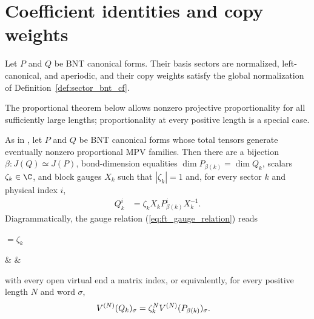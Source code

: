 \section{Coefficient identities and copy weights}
\label{sec:sector_bnt_full_basis_global_gauge}

Let $P$ and $Q$ be BNT canonical forms. Their basis sectors are normalized,
left-canonical, and aperiodic, and their copy weights satisfy the global
normalization of Definition~\ref{def:sector_bnt_cf}.

The proportional theorem below allows nonzero projective proportionality for
all sufficiently large lengths; proportionality at every positive length is a
special case.

\begin{lemma}%
    \label{thm:sector_bnt_proportional_sector_match_witnesses}
    \leanok
    As in \cite[Appendix MPV theorem statement, lines~1167--1170, and proof
        line~1182]{Cirac2016MPDO_arXiv}, let $P$ and $Q$ be BNT canonical forms
    whose total tensors generate eventually nonzero proportional MPV families.
    Then there are a bijection $\beta:J(Q)\simeq J(P)$, bond-dimension
    equalities $\dim P_{\beta(k)}=\dim Q_k$, scalars
    $\zeta_k\in\C$, and block gauges $X_k$ such that $|\zeta_k|=1$ and, for
    every sector $k$ and physical index $i$,
    \begin{align}
        Q_k^i
         & = \zeta_k X_k P_{\beta(k)}^i X_k^{-1}.
        \label{eq:ft_gauge_relation}
    \end{align}
    Diagrammatically, the gauge relation (\ref{eq:ft_gauge_relation}) reads
    \begin{center}
        \tenkzkernel
        \begin{tenkz}[rows={wire}, cols=1, west=open, east=open]
        \end{tenkz}
        $ = \zeta_k$
        \begin{tenkz}[rows={wire}, cols=3, west=open, east=open]
             &
             &
        \end{tenkz}
    \end{center}
    with every open virtual end a matrix index, or equivalently, for every
    positive length $N$ and word $\sigma$,
    \begin{align}
        V^{(N)}(Q_k)_\sigma
         & = \zeta_k^N V^{(N)}(P_{\beta(k)})_\sigma.
        \notag
    \end{align}
\end{lemma}

